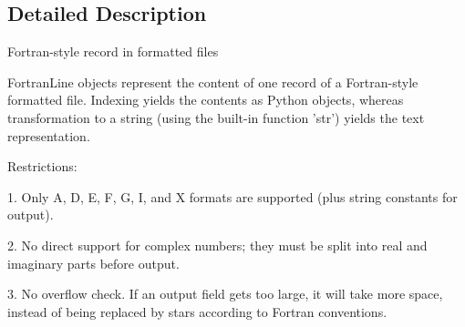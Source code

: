 \subsection{Detailed Description}
\begin{DoxyVerb}Fortran-style record in formatted files

FortranLine objects represent the content of one record of a
Fortran-style formatted file. Indexing yields the contents as
Python objects, whereas transformation to a string (using the
built-in function 'str') yields the text representation.

Restrictions:

  1. Only A, D, E, F, G, I, and X formats are supported (plus string
     constants for output).

  2. No direct support for complex numbers; they must be split into
     real and imaginary parts before output.

  3. No overflow check. If an output field gets too large, it will
     take more space, instead of being replaced by stars according
     to Fortran conventions.
\end{DoxyVerb}
 

